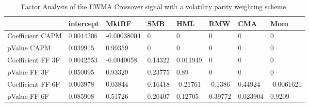 \begin{table}[H]
\centering
\begin{tabular}{llllllll}
& intercept & MktRF & SMB & HML & RMW & CMA & Mom \\ 
\hline 
Coefficient CAPM & 0.0044206 & -0.00038004 & 0 & 0 & 0 & 0 & 0 \\ 
pValue CAPM & 0.039915 & 0.99359 & 0 & 0 & 0 & 0 & 0 \\ 
Coefficient FF 3F & 0.0042553 & -0.0040058 & 0.14322 & 0.011949 & 0 & 0 & 0 \\ 
pValue FF 3F & 0.050095 & 0.93329 & 0.23775 & 0.89 & 0 & 0 & 0 \\ 
Coefficient FF 6F & 0.003978 & 0.03844 & 0.16418 & -0.21761 & -0.1386 & 0.44924 & -0.0061621 \\ 
pValue FF 6F & 0.085908 & 0.51726 & 0.20407 & 0.12705 & 0.39772 & 0.023904 & 0.9209 \\ 
\hline
\end{tabular}
\caption{Factor Analysis of the EWMA Crossover signal with a volatility parity weighting scheme.}
\label{MBBSVPOQ_FACTOR}
\end{table}